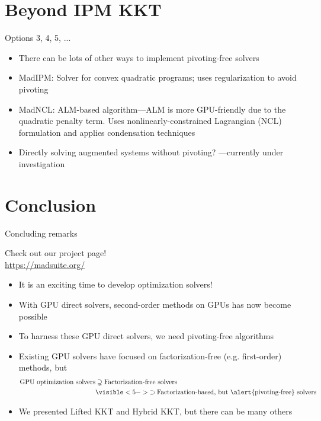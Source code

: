 \documentclass[aspectratio=169,11pt]{beamer}
\begin{document}
\section{Beyond IPM KKT}
\begin{frame}{Options 3, 4, 5, ...}
  \begin{itemize}
  \item There can be lots of other ways to implement pivoting-free solvers
  \item<2-> \alert{MadIPM}: Solver for convex quadratic programs; uses regularization to avoid pivoting \citep{montoisonGPUImplementationSecondOrder2025}
  \item<3-> \alert{MadNCL}: ALM-based algorithm---ALM is more \alert{GPU-friendly} due to the quadratic penalty term. Uses nonlinearly-constrained Lagrangian (NCL) formulation and applies condensation techniques \citep{montoisonMadNCLGPUImplementation2025}
  \item<4-> Directly solving augmented systems without pivoting? ---currently under investigation
  \end{itemize}
\end{frame}

\section{Conclusion}
\begin{frame}{Concluding remarks}
  \begin{center}
    Check out our project page!\\
    \url{https://madsuite.org/}
  \end{center}
  \begin{itemize}
  \item It is an exciting time to develop optimization solvers!
  \item<2-> With \alert{GPU direct solvers}, \alert{second-order methods} on GPUs has now become possible
  \item<3-> To harness these GPU direct solvers, we need \alert{pivoting-free algorithms}
  \item<4-> Existing GPU solvers have focused on \alert{factorization-free} (e.g. first-order) methods, but
      \begin{align*}
        \text{GPU optimization solvers}
        &\supsetneq \text{Factorization-free solvers}\\
        &\visible<5->{\supset\text{Factorization-baesd, but \alert{pivoting-free} solvers}}
      \end{align*}
  \item<6-> We presented \alert{Lifted KKT} and \alert{Hybrid KKT}, but there can be many others
  \end{itemize}
\end{frame}
\end{document}
